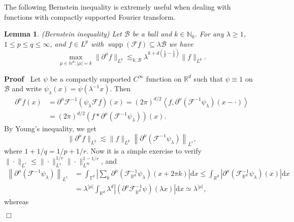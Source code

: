 \documentclass[a4paper,11pt]{article}
\newcommand{\cdummy}{\cdot}
\newcommand{\mathd}{\mathrm{d}}
\newcommand{\nocomma}{}
\newcommand{\tmop}[1]{\ensuremath{\operatorname{#1}}}
\newenvironment{proof}{\noindent\textbf{Proof\ }}{\hspace*{\fill}$\Box$\medskip}
\newtheorem{lemma}{Lemma}
{\theorembodyfont{\rmfamily}\newtheorem{remark}{Remark}}
\newcommand{\CB}{\mathscr{B}}
\newcommand{\CF}{\mathscr{F}}
\begin{document}
The following Bernstein inequality is extremely useful when dealing with
functions with compactly supported Fourier transform.

\begin{lemma}
  \label{lemma:Bernstein}(Bernstein inequality) Let $\CB$ be a ball and $k \in
  \mathbb{N}_0$. For any $\lambda \geqslant 1$, $1 \leqslant p \leqslant q
  \leqslant \infty$, and $f \in L^p$ with $\tmop{supp} (\CF f) \subseteq
  \lambda \CB$ we have
  \[ \max_{{\mu} \in \mathbb{N}^d : |{\mu}| = k} \|
     \partial^{{\mu}} f\|_{L^q} \lesssim_{k, \CB} \lambda^{k + d \left(
     \frac{1}{p} - \frac{1}{q} \right)} \|f\|_{L^p} . \]
\end{lemma}

\begin{proof}
  Let $\psi$ be a compactly supported $C^{\infty}$ function on $\mathbb{R}^d$
  such that $\psi \equiv 1$ on $\CB$ and write $\psi_{\lambda} (x) = \psi
  (\lambda^{- 1} x)$. Then
  \begin{align*}
      \partial^{{\mu}} f (x) & = \partial^{{\mu}} \CF^{- 1} \left( \psi_{\lambda} \CF f \right) (x) = (2 \pi)^{d / 2} \left\langle f,    \partial^{{\mu}} \left( \CF^{- 1} \psi_{\lambda} \right) (x - \cdummy) \right\rangle \\
      & = (2 \pi)^{d / 2} \left( f \ast     \partial^{{\mu}} \left( \CF^{- 1} \psi_{\lambda} \right) \right) (x).
   \end{align*}
  By Young's inequality, we get
  \[ \| \partial^{{\mu}} f \|_{L^q} \lesssim \| f \|_{L^p} \left\|
     \partial^{{\mu}} \left( \CF^{- 1} \psi_{\lambda} \right)
     \right\|_{L^r}, \]
  where $1 + 1 / q = 1 / p + 1 / r$. Now it is a simple exercise to verify $\|
  \cdummy \|_{L^r} \leqslant \| \cdummy \|_{L^1}^{1 / r} \| \cdummy
  \|_{L^{\infty}}^{1 - 1 / r}$, and
  \begin{align*}
     \left\| \partial^{{\mu}} \left( \CF^{- 1} \psi_{\lambda} \right) \right\|_{L^1} & = \int_{\mathbb{T}^d} \left| \sum_k \partial^{{\mu}} \left( \CF^{- 1}_{\mathbb{R}^d} \psi_{\lambda} \right) (x + 2 \pi k) \right| \mathd x \leqslant \int_{\mathbb{R}^d} \left| \partial^{{\mu}} \left( \CF^{- 1}_{\mathbb{R}^d} \psi_{\lambda} \right) (x) \right| \mathd x \\
      & = \lambda^{| {\mu} |} \int_{\mathbb{R}^d} \lambda^d \left| \left( \partial^{{\mu}} \CF^{- 1}_{\mathbb{R}^d} \psi \right) (\lambda x)\right| \mathd x \simeq \lambda^{| {\mu} |} \nocomma,
  \end{align*}
  whereas
  \begin{align*}

\end{align*}
\end{proof}
\end{document}
